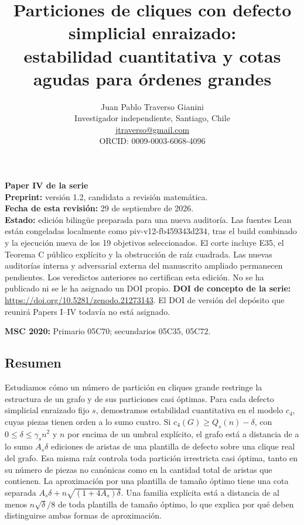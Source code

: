 \documentclass[spanish,11pt,a4paper]{article}
\title{Particiones de cliques con defecto simplicial enraizado:\\estabilidad cuantitativa y cotas agudas para órdenes grandes}
\author{Juan Pablo Traverso Gianini\\
\small Investigador independiente, Santiago, Chile\\
\small \href{mailto:jtraverso@gmail.com}{jtraverso@gmail.com}\\
\small ORCID: 0009-0003-6068-4096}
\date{}
\begin{document}
\raggedbottom
\maketitle
\textbf{Paper IV de la serie}\\
\textbf{Preprint:} versión 1.2, candidata a revisión matemática.\\
\textbf{Fecha de esta revisión:} 29 de septiembre de 2026.\\
\textbf{Estado:} edición bilingüe preparada para una nueva auditoría. Las fuentes Lean están congeladas localmente como {\ttfamily\small piv-\discretionary{\hbox{\ensuremath{\hookrightarrow}}}{}{}v12-\discretionary{\hbox{\ensuremath{\hookrightarrow}}}{}{}fb459343d234}, tras el build combinado y la ejecución nueva de los 19 objetivos seleccionados. El corte incluye E35, el Teorema C público explícito y la obstrucción de raíz cuadrada. Las nuevas auditorías interna y adversarial externa del manuscrito ampliado permanecen pendientes. Los veredictos anteriores no certifican esta edición. No se ha publicado ni se le ha asignado un DOI propio. \textbf{DOI de concepto de la serie:} \url{https://doi.org/10.5281/zenodo.21273143}. El DOI de versión del depósito que reunirá Papers I--IV todavía no está asignado.

\textbf{MSC 2020:} Primario 05C70; secundarios 05C35, 05C72.

\subsection{Resumen}\label{resumen}

Estudiamos cómo un número de partición en cliques grande restringe la estructura de un grafo y de sus particiones casi óptimas. Para cada defecto simplicial enraizado fijo \(s\), demostramos estabilidad cuantitativa en el modelo \(c_4\), cuyas piezas tienen orden a lo sumo cuatro. Si \(c_4(G)\ge Q_s(n)-\delta\), con \(0\le\delta\le\gamma_s n^2\) y \(n\) por encima de un umbral explícito, el grafo está a distancia de a lo sumo \(A_s\delta\) ediciones de aristas de una plantilla de defecto sobre una clique real del grafo. Esa misma raíz controla toda partición irrestricta casi óptima, tanto en su número de piezas no canónicas como en la cantidad total de aristas que contienen. La aproximación por una plantilla de tamaño óptimo tiene una cota separada \(A_s\delta+n\sqrt{(1+4A_s)\delta}\). Una familia explícita está a distancia de al menos \(n\sqrt{\delta}/8\) de toda plantilla de tamaño óptimo, lo que explica por qué deben distinguirse ambas formas de aproximación.
\end{document}
